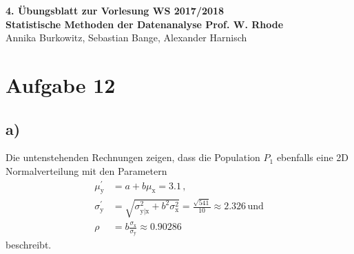 \documentclass[a4paper, 11pt]{article}
\begin{document}
\noindent
\large{\textbf{4. Übungsblatt zur Vorlesung \hfill WS 2017/2018 \\
Statistische Methoden der Datenanalyse \hfill Prof. W. Rhode}} \\
Annika Burkowitz, Sebastian Bange, Alexander Harnisch \\
\noindent\makebox[\linewidth]{\rule{\textwidth}{0.4pt}}

\section*{Aufgabe 12}
\subsection*{a)}
Die untenstehenden Rechnungen zeigen, dass die Population $P_1$ ebenfalls eine
2D Normalverteilung mit den Parametern
\begin{align*}
  \mu_\text{y}^{'} &= a + b\mu_\text{x}=3.1\,, \\
  \sigma_\text{y}^{'} &= \sqrt{\sigma_\text{y|x}^2+b^2\sigma_\text{x}^2}
    = \frac{\sqrt{541}}{10} \approx 2.326\, \text{und}\\
  \rho &= b \frac{\sigma_\text{x}}{\sigma_\text{y}} \approx 0.90286
\end{align*}
beschreibt.
\end{document}
